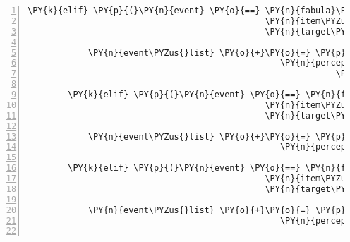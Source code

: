 \begin{Verbatim}[commandchars=\\\{\},numbers=left,firstnumber=1,stepnumber=1]
        \PY{k}{elif} \PY{p}{(}\PY{n}{event} \PY{o}{==} \PY{n}{fabula}\PY{o}{.}\PY{n}{TriesToDropEvent}\PY{p}{(}\PY{n}{identifier}\PY{o}{=}\PY{n}{ID\PYZus{}CASSANDRA}\PY{p}{,}
                                               \PY{n}{item\PYZus{}identifier}\PY{o}{=}\PY{l+s}{\PYZsq{}}\PY{l+s}{cobweb}\PY{l+s}{\PYZsq{}}\PY{p}{,}
                                               \PY{n}{target\PYZus{}identifier}\PY{o}{=}\PY{l+s}{\PYZsq{}}\PY{l+s}{spider}\PY{l+s}{\PYZsq{}}\PY{p}{)}\PY{p}{)}\PY{p}{:}

            \PY{n}{event\PYZus{}list} \PY{o}{+}\PY{o}{=} \PY{p}{[}\PY{n}{fabula}\PY{o}{.}\PY{n}{PerceptionEvent}\PY{p}{(}\PY{n}{identifier}\PY{o}{=}\PY{n}{ID\PYZus{}CASSANDRA}\PY{p}{,}
                                                  \PY{n}{perception}\PY{o}{=}\PY{l+s}{\PYZsq{}}\PY{l+s}{Ganz schön klebrig, }\PY{l+s}{\PYZsq{}}
                                                             \PY{l+s}{\PYZsq{}}\PY{l+s}{vielleicht kann ich es besser woanders benutzen.}\PY{l+s}{\PYZsq{}}\PY{p}{)}\PY{p}{]}

        \PY{k}{elif} \PY{p}{(}\PY{n}{event} \PY{o}{==} \PY{n}{fabula}\PY{o}{.}\PY{n}{TriesToDropEvent}\PY{p}{(}\PY{n}{identifier}\PY{o}{=}\PY{n}{ID\PYZus{}CASSANDRA}\PY{p}{,}
                                               \PY{n}{item\PYZus{}identifier}\PY{o}{=}\PY{l+s}{\PYZsq{}}\PY{l+s}{cobweb}\PY{l+s}{\PYZsq{}}\PY{p}{,}
                                               \PY{n}{target\PYZus{}identifier}\PY{o}{=}\PY{l+s}{\PYZsq{}}\PY{l+s}{sign}\PY{l+s}{\PYZsq{}}\PY{p}{)}\PY{p}{)}\PY{p}{:}

            \PY{n}{event\PYZus{}list} \PY{o}{+}\PY{o}{=} \PY{p}{[}\PY{n}{fabula}\PY{o}{.}\PY{n}{PerceptionEvent}\PY{p}{(}\PY{n}{identifier}\PY{o}{=}\PY{n}{ID\PYZus{}CASSANDRA}\PY{p}{,}
                                                  \PY{n}{perception}\PY{o}{=}\PY{l+s}{\PYZsq{}}\PY{l+s}{Ich möchte den Spinnweb nicht an das Schild kleben.}\PY{l+s}{\PYZsq{}}\PY{p}{)}\PY{p}{]}

        \PY{k}{elif} \PY{p}{(}\PY{n}{event} \PY{o}{==} \PY{n}{fabula}\PY{o}{.}\PY{n}{TriesToDropEvent}\PY{p}{(}\PY{n}{identifier}\PY{o}{=}\PY{n}{ID\PYZus{}CASSANDRA}\PY{p}{,}
                                               \PY{n}{item\PYZus{}identifier}\PY{o}{=}\PY{l+s}{\PYZsq{}}\PY{l+s}{cobweb}\PY{l+s}{\PYZsq{}}\PY{p}{,}
                                               \PY{n}{target\PYZus{}identifier}\PY{o}{=}\PY{l+s}{\PYZsq{}}\PY{l+s}{door}\PY{l+s}{\PYZsq{}}\PY{p}{)}\PY{p}{)}\PY{p}{:}

            \PY{n}{event\PYZus{}list} \PY{o}{+}\PY{o}{=} \PY{p}{[}\PY{n}{fabula}\PY{o}{.}\PY{n}{PerceptionEvent}\PY{p}{(}\PY{n}{identifier}\PY{o}{=}\PY{n}{ID\PYZus{}CASSANDRA}\PY{p}{,}
                                                  \PY{n}{perception}\PY{o}{=}\PY{l+s}{\PYZsq{}}\PY{l+s}{Warum soll ich Spinnweben an diese Tür kleben?}\PY{l+s}{\PYZsq{}}\PY{p}{)}\PY{p}{]}


\end{Verbatim}
